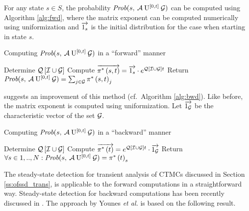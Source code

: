 \documentclass[times, 10pt,twocolumn]{article}
\begin{document}
		For any state $s \in S$, the probability $\mbox{\it Prob}(s, \: \mathcal{A} \: \mathrm{U}^{[0,t]} \: \mathcal{G} )$ can be computed using Algorithm \ref{alg:fwd}, where the matrix exponent can be computed numerically using uniformization and $\overrightarrow{1_{s} }$ is the initial distribution for the case when starting in state $s$.
		\begin{algorithm}
			\caption{Computing $\mbox{\it Prob}(s, \: \mathcal{A} \: \mathrm{U}^{[0,t]} \: \mathcal{G} )$ in a ``forward'' manner}
			\label{alg:fwd}
			\begin{algorithmic}[1]
				\STATE Determine $\mathcal{Q}\left[ \mathcal{I} \cup \mathcal{G} \right]$
				\STATE Compute $\overrightarrow{\pi^{*} \left(s, t \right)} = \overrightarrow{1_{s} } \cdot e^{\mathcal{Q}\left[ \mathcal{I} \cup \mathcal{G} \right] t}$
				\STATE Return $\mbox{\it Prob}(s, \: \mathcal{A} \: \mathrm{U}^{[0,t]} \: \mathcal{G} ) = \sum_{j \in \mathcal{G}}\pi^{*} \left(s, t \right)_{j}$
			\end{algorithmic}
		\end{algorithm}
		\cite{KatoenKNP_LNCS01} suggests an improvement of this method (cf.\ Algorithm \ref{alg:bwd}).  Like before, the matrix exponent is computed using uniformization.  Let $\overrightarrow{1_{\mathcal{G}}}$ be the characteristic vector of the set $\mathcal{G}$.

		\begin{algorithm}
			\caption{Computing $\mbox{\it Prob}(s, \: \mathcal{A} \: \mathrm{U}^{[0,t]} \: \mathcal{G} )$ in a ``backward'' manner}
			\label{alg:bwd}
			\begin{algorithmic}[1]
				\STATE Determine $\mathcal{Q}\left[ \mathcal{I} \cup \mathcal{G} \right]$
				\STATE Compute $\overrightarrow{\pi^{*} \left( t \right)} = e^{\mathcal{Q}\left[ \mathcal{I} \cup \mathcal{G} \right] t} \cdot \overrightarrow{1_{\mathcal{G}}}$
				\STATE Return $\forall s \in 1,..,N : \mbox{\it Prob}(s, \: \mathcal{A} \: \mathrm{U}^{[0,t]} \: \mathcal{G} ) = \pi^{*} \left( t \right)_{s}$
			\end{algorithmic}
		\end{algorithm}
	
		The steady-state detection for transient analysis of CTMCs discussed in Section \ref{ss:ofssd_trans}, is applicable to the forward computations in a straightforward way.
Steady-state detection for backward computations has been recently discussed in \cite{YounesKNP_STTT05}.  The approach by Younes \emph{et al.} is based on the following result.
\end{document}
